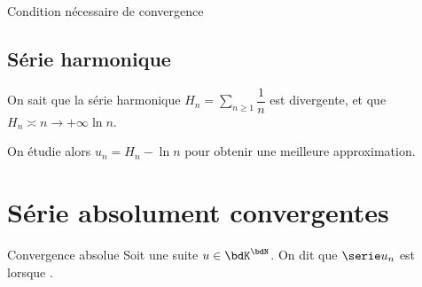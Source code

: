 \documentclass[a4paper,french,bookmarks]{article}
\begin{document}
\begin{property}{Condition nécessaire de convergence}{}
    
\end{property}

\subsection{Série harmonique}

On sait que la série harmonique $H_n = \sum\limits_{n \geq 1} \dfrac{1}{n}$ est divergente, et que $H_n \asymp{n \to +\infty} \ln n$.

On étudie alors $u_n = H_n - \ln n$ pour obtenir une meilleure approximation.

\section{Série absolument convergentes}

\begin{definition}{Convergence absolue}
    Soit une suite $u \in \bdK^\bdN$. On dit que $\serie u_n$ est  lorsque .
\end{definition}
\end{document}
